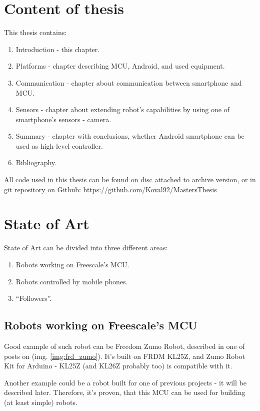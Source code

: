\section{Content of thesis}
This thesis contains:
\begin{enumerate}
  \item Introduction - this chapter.
  \item Platforms - chapter describing MCU, Android, and used equipment.
  \item Communication - chapter about communication between smartphone and MCU.
  \item Sensors - chapter about extending robot's capabilities by using one of
  smartphone's sensors - camera.
  \item Summary - chapter with conclusions, whether Android smartphone can be
  used as high-level controller.
  \item Bibliography.
\end{enumerate}
All code used in this thesis can be found on disc attached to archive version,
or in git repository on Github: \url{https://github.com/Koval92/MastersThesis}

\section{State of Art}
State of Art can be divided into three different areas:
\begin{enumerate}
  \item Robots working on Freescale's MCU.
  \item Robots controlled by mobile phones.
  \item ``Followers''.
\end{enumerate}

\subsection{Robots working on Freescale's MCU}
Good example of such robot can be Freedom Zumo Robot, described in one of posts
on \cite{mcu_on_eclipse} (img. \ref{img:frd_zumo}).
It's built on FRDM KL25Z, and Zumo Robot Kit for Arduino - KL25Z (and KL26Z
probably too) is compatible with it.

Another example could be a robot built for one of previous projects - it will be
described later.
Therefore, it's proven, that this MCU can be used for building (at least simple)
robots.

